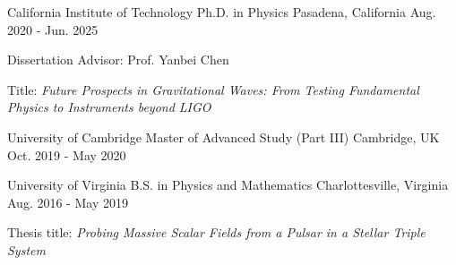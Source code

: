 


\begin{cventries}


  
  \cventry
    {California Institute of Technology} %
    {Ph.D. in Physics} %
    {Pasadena, California} %
    {Aug. 2020 - Jun. 2025} %
    { \begin{cvitems} %
      \item[] Dissertation Advisor: Prof. Yanbei Chen 
      \item[] Title: \textit{Future Prospects in Gravitational Waves: From Testing Fundamental Physics to Instruments beyond LIGO}
      \end{cvitems}
      }
      \vspace*{1em}
      
  \cventry
    {University of Cambridge}
    {Master of Advanced Study (Part III)} %
    {Cambridge, UK} %
    {Oct. 2019 - May 2020} %
    {%
    }
    
  \cventry
    {University of Virginia} %
    {B.S. in Physics and Mathematics} %
    {Charlottesville, Virginia} %
    {Aug. 2016 - May 2019} %
    {%
      \begin{cvitems} %
        \item[] Thesis title: \textit{Probing Massive Scalar Fields from a Pulsar in a Stellar Triple System}
      \end{cvitems}
    }

\end{cventries}
